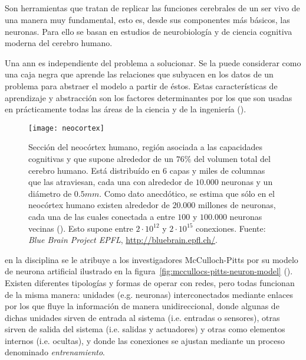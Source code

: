 \subsection{}

Son herramientas que tratan de replicar las funciones cerebrales de un ser vivo de una manera muy fundamental, esto es, desde sus componentes más básicos, las neuronas. Para ello se basan en estudios de neurobiología y de ciencia cognitiva moderna del cerebro humano.

Una \ac{ann} es independiente del problema a solucionar. Se la puede considerar como una caja negra que aprende las relaciones que subyacen en los datos de un problema para abstraer el modelo a partir de éstos. Estas características de aprendizaje y abstracción son los factores determinantes por los que son usadas en prácticamente todas las áreas de la ciencia y de la ingeniería (\cite{Du2006}).

\begin{figure}
	\texttt{[image: neocortex]}
	\caption[Ilustración de una sección del neocórtex humano]{Sección del neocórtex humano, región asociada a las capacidades cognitivas y que supone alrededor de un $76\%$ del volumen total del cerebro humano. Está distribuído en $6$ capas y miles de columnas que las atraviesan, cada una con alrededor de $10.000$ neuronas y un diámetro de $0.5mm$.  Como dato anecdótico, se estima que sólo en el neocórtex humano existen alrededor de $20.000$ millones de neuronas, cada una de las cuales conectada a entre $100$ y $100.000$ neuronas vecinas (\cite{Pakkenberg1997}). Esto supone entre $2 \cdot 10^{12}$ y $2 \cdot 10^{15}$ conexiones. Fuente: \textit{Blue Brain Project EPFL}, \url{http://bluebrain.epfl.ch/}.}
	\label{fig:neocortex}
\end{figure}

 en la disciplina se le atribuye a  los investigadores McCulloch-Pitts por su modelo de neurona artificial ilustrado en la figura~\ref{fig:mccullocs-pitts-neuron-model} (\cite{McCulloch1943}). Existen diferentes tipologías y formas de operar con redes, pero todas funcionan de la misma manera: unidades (e.g. neuronas) interconectados mediante enlaces por los que fluye la información de manera unidireccional, donde algunas de dichas unidades sirven de entrada al sistema (i.e. entradas o sensores), otras sirven de salida del sistema (i.e. salidas y actuadores) y otras como elementos internos (i.e. ocultas), y donde las conexiones se ajustan mediante un proceso denominado \textit{entrenamiento}.

